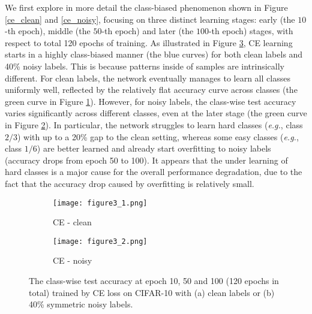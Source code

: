 \documentclass[10pt,twocolumn,letterpaper]{article}
\begin{document}
We first explore in more detail the class-biased phenomenon shown in Figure \ref{ce_clean} and \ref{ce_noisy}, focusing on three distinct learning stages: early (the $10$-th epoch), middle (the $50$-th epoch) and later (the $100$-th epoch) stages, with respect to total 120 epochs of training. 
As illustrated in Figure \ref{fig:biased_class_test_acc}, CE learning starts in a highly class-biased manner (the blue curves) for both clean labels and 40\% noisy labels. 
This is because patterns inside of samples are intrinsically different. For clean labels, the network eventually manages to learn all classes uniformly well, reflected by the relatively flat accuracy curve across classes (the green curve in Figure \ref{acc_ce_clean}). However, for noisy labels, the class-wise test accuracy varies significantly across different classes, even at the later stage (the green curve in Figure \ref{acc_ce_noisy}). In particular, the network struggles to learn hard classes (\textit{e.g.}, class $2/3$) with up to a 20\% gap to the clean setting, whereas some easy classes (\textit{e.g.}, class $1/6$) are better learned and already start overfitting to noisy labels (accuracy drops from epoch 50 to 100). It appears that the under learning of hard classes is a major cause for the overall performance degradation, due to the fact that the accuracy drop caused by overfitting is relatively small.  


\begin{figure}[!t]
	\centering
	\begin{subfigure}{0.49\linewidth}
		\texttt{[image: figure3\_1.png]}
		\caption{CE - clean}
		\label{acc_ce_clean}
	\end{subfigure}
	\begin{subfigure}{0.49\linewidth} 
		\texttt{[image: figure3\_2.png]}
		\caption{CE - noisy} 
		\label{acc_ce_noisy}
	\end{subfigure}
	\vspace{-0.1 in}
	\caption{The class-wise test accuracy at epoch 10, 50 and 100 (120 epochs in total) trained by CE loss on CIFAR-10 with (a) clean labels or (b) 40\% symmetric noisy labels.}
	\label{fig:biased_class_test_acc}
	\vspace{-0.1 in}
\end{figure}
\end{document}
